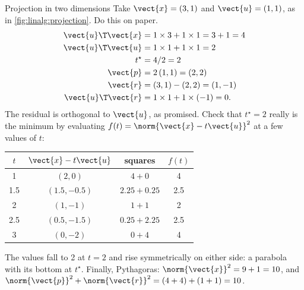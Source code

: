 \begin{worked}[label={we:linalg:proj2d}]{Projection in two dimensions}
Take $\vect{x} = (3, 1)$ and $\vect{u} = (1, 1)$, as in \cref{fig:linalg:projection}. Do this on
paper.
\begin{align*}
\vect{u}\T\vect{x} &= 1\times3 + 1\times1 = 3 + 1 = 4\\
\vect{u}\T\vect{u} &= 1\times1 + 1\times1 = 2\\
t^\star &= 4 / 2 = 2\\
\vect{p} &= 2\,(1, 1) = (2, 2)\\
\vect{r} &= (3, 1) - (2, 2) = (1, -1)\\
\vect{u}\T\vect{r} &= 1\times1 + 1\times(-1) = 0 .
\end{align*}
The residual is orthogonal to $\vect{u}$, as promised. Check that $t^\star = 2$ really is the
minimum by evaluating $f(t) = \norm{\vect{x}-t\vect{u}}^2$ at a few values of $t$:
\begin{center}
\begin{tabular}{cccc}
\toprule
$t$ & $\vect{x} - t\vect{u}$ & squares & $f(t)$\\
\midrule
1   & $(2, 0)$      & $4 + 0$         & 4\\
1.5 & $(1.5, -0.5)$ & $2.25 + 0.25$   & 2.5\\
2   & $(1, -1)$     & $1 + 1$         & 2\\
2.5 & $(0.5, -1.5)$ & $0.25 + 2.25$   & 2.5\\
3   & $(0, -2)$     & $0 + 4$         & 4\\
\bottomrule
\end{tabular}
\end{center}
The values fall to 2 at $t = 2$ and rise symmetrically on either side: a parabola with its
bottom at $t^\star$. Finally, Pythagoras: $\norm{\vect{x}}^2 = 9 + 1 = 10$, and
$\norm{\vect{p}}^2 + \norm{\vect{r}}^2 = (4 + 4) + (1 + 1) = 10$.
\end{worked}

